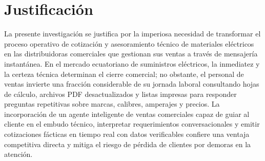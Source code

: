\section{Justificación}

La presente investigación se justifica por la imperiosa necesidad de transformar el proceso operativo de cotización y asesoramiento técnico de materiales eléctricos en las distribuidoras comerciales que gestionan sus ventas a través de mensajería instantánea. En el mercado ecuatoriano de suministros eléctricos, la inmediatez y la certeza técnica determinan el cierre comercial; no obstante, el personal de ventas invierte una fracción considerable de su jornada laboral consultando hojas de cálculo, archivos PDF desactualizados y listas impresas para responder preguntas repetitivas sobre marcas, calibres, amperajes y precios. La incorporación de un agente inteligente de ventas comerciales capaz de guiar al cliente en el embudo técnico, interpretar requerimientos conversacionales y emitir cotizaciones fácticas en tiempo real con datos verificables confiere una ventaja competitiva directa y mitiga el riesgo de pérdida de clientes por demoras en la atención.

